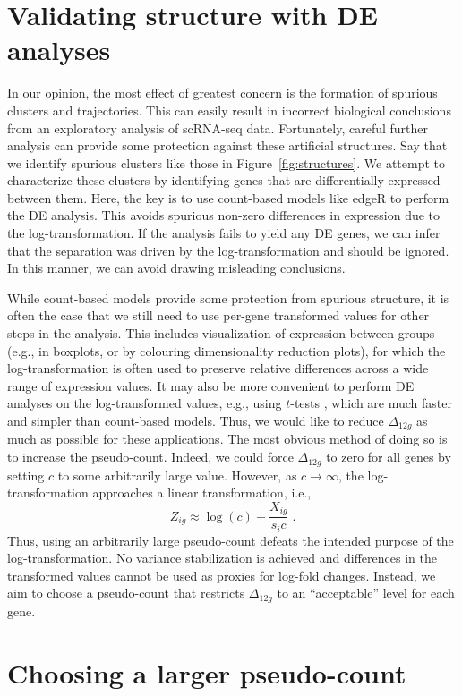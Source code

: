 \documentclass[10pt,letterpaper]{article}
\begin{document}
\section{Validating structure with DE analyses}
In our opinion, the most effect of greatest concern is the formation of spurious clusters and trajectories.
This can easily result in incorrect biological conclusions from an exploratory analysis of scRNA-seq data.
Fortunately, careful further analysis can provide some protection against these artificial structures.
Say that we identify spurious clusters like those in Figure~\ref{fig:structures}.
We attempt to characterize these clusters by identifying genes that are differentially expressed between them.
Here, the key is to use count-based models like edgeR \cite{robinson2010edgeR} to perform the DE analysis.
This avoids spurious non-zero differences in expression due to the log-transformation.
If the analysis fails to yield any DE genes, we can infer that the separation was driven by the log-transformation and should be ignored.
In this manner, we can avoid drawing misleading conclusions.

While count-based models provide some protection from spurious structure, it is often the case that we still need to use per-gene transformed values for other steps in the analysis.
This includes visualization of expression between groups (e.g., in boxplots, or by colouring dimensionality reduction plots), for which the log-transformation is often used to preserve relative differences across a wide range of expression values.
It may also be more convenient to perform DE analyses on the log-transformed values, e.g., using $t$-tests \cite{law2014voom}, which are much faster and simpler than count-based models.
Thus, we would like to reduce $\Delta_{12g}$ as much as possible for these applications.
The most obvious method of doing so is to increase the pseudo-count.
Indeed, we could force $\Delta_{12g}$ to zero for all genes by setting $c$ to some arbitrarily large value.
However, as $c \to \infty$, the log-transformation approaches a linear transformation, i.e.,
\[
    Z_{ig} \approx \log(c) + \frac{X_{ig}}{s_i c} \;.
\]
Thus, using an arbitrarily large pseudo-count defeats the intended purpose of the log-transformation. 
No variance stabilization is achieved and differences in the transformed values cannot be used as proxies for log-fold changes. 
Instead, we aim to choose a pseudo-count that restricts $\Delta_{12g}$ to an ``acceptable'' level for each gene.

\section{Choosing a larger pseudo-count}
\end{document}
